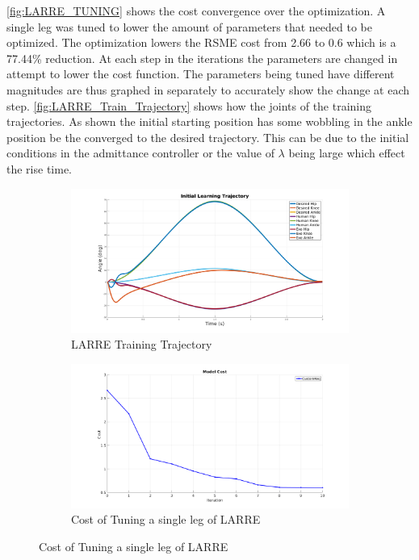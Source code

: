 \autoref{fig:LARRE_TUNING} shows the cost convergence over the optimization. A single leg was tuned to lower the amount of parameters that needed to be optimized. The optimization lowers the RSME cost from 2.66 to 0.6 which is a 77.44\% reduction. At each step in the iterations the parameters are changed in attempt to lower the cost function. The parameters being tuned have different magnitudes are thus graphed in separately to accurately show the change at each step. \autoref{fig:LARRE_Train_Trajectory} shows how the joints of the training trajectories. As shown the initial starting position has some wobbling in the ankle position be the converged to the desired trajectory. This can be due to the initial conditions in the admittance controller or the value of $\lambda$ being large which effect the rise time.  

\begin{figure}
    \centering
    \begin{subfigure}[b]{\textwidth}
        \centering
        \includegraphics[width=0.8\columnwidth]{images/controllers/trajs/init_traj.png}
        \caption[LARRE Training Trajectory]{LARRE Training Trajectory}
        \label{fig:LARRE_Train_Trajectory}
    \end{subfigure}
    
    \begin{subfigure}[b]{\textwidth}
        \centering
        \includegraphics[width=0.8\columnwidth]{images/controllers/trajs/cost.png}
        \caption[LARRE Cost Optimization]{Cost of Tuning a single leg of LARRE}
        \label{fig:LARRE_TUNING}
    \end{subfigure}
  

\end{figure}
